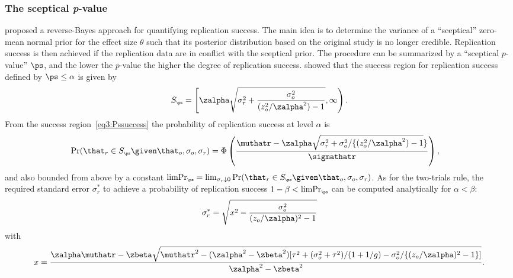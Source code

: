 \subsubsection{The sceptical \textit{p}-value}
\citet{Held2020} proposed a reverse-Bayes approach for quantifying replication
success. The main idea is to determine the variance of a ``sceptical'' zero-mean
normal prior for the effect size $\theta$ such that its posterior distribution
based on the original study is no longer credible. Replication success is then
achieved if the replication data are in conflict with the sceptical prior. The
procedure can be summarized by a ``sceptical $p$-value'' $\ps$, and the lower
the $p$-value the higher the degree of replication success. \citet[sec.
2.1]{Held2021} showed that the success region for replication success defined by
$\ps \leq \alpha$ is given by
\begin{align}
  \label{eq3:Pssuccess}
  S_{\scriptscriptstyle \ps}
  = \left[\zalpha \sqrt{\sigma^{2}_{r} +
  \frac{\sigma^{2}_{o}}{(z_{o}^{2}/\zalpha^{2}) - 1}}, \infty\right).
\end{align}
From the success region~\eqref{eq3:Pssuccess} the probability of replication
success at level $\alpha$ is
\begin{align*}
  \Pr(\that_r \in S_{\scriptscriptstyle \ps} \given \that_{o}, \sigma_{o}, \sigma_{r})
  &=%
     \Phi\left(\frac{\muthatr - \zalpha \sqrt{\sigma^{2}_{r} +
    \sigma^{2}_{o}/\{(z_{o}^{2}/\zalpha^{2}) - 1}\}}{\sigmathatr}\right),
\end{align*}
and also bounded from above by a constant
$\text{limPr}_{\scriptscriptstyle \ps} = \lim_{\sigma_{r} \downarrow 0} \Pr(\that_r \in S_{\scriptscriptstyle \ps} \given \that_{o}, \sigma_{o}, \sigma_{r})$.
As for the two-trials rule, the required standard error $\sigma_{r}^{*}$ to
achieve a probability of replication success
$1 - \beta < \text{limPr}_{\scriptscriptstyle \ps}$ can be computed analytically
for $\alpha < \beta$:
\begin{align*}
  \sigma_{r}^{*} = \sqrt{x^{2} - \frac{\sigma^{2}_{o}}{(z_{o}/\zalpha)^{2} - 1}}
\end{align*}
with
\begin{align*}
  x = \frac{\zalpha \muthatr - \zbeta \sqrt{\muthatr^{2} - (\zalpha^{2} - \zbeta^{2})
  [\tau^{2} + (\sigma^{2}_{o} + \tau^{2})/(1 + 1/g) - \sigma^{2}_{o}/\{(z_{o}/\zalpha)^{2}
  - 1\}]}}{\zalpha^{2} - \zbeta^{2}}.
\end{align*}


